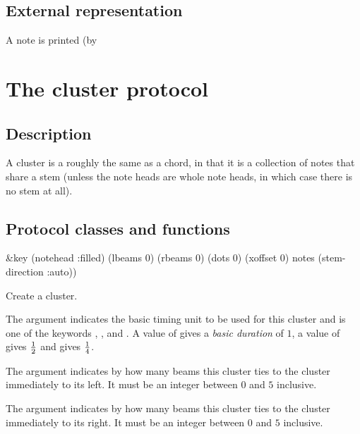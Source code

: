 \subsection{External representation}

A note is printed (by 

\section{The cluster protocol}

\subsection{Description}

A cluster is a roughly the same as a chord, in that it is a collection
of notes that share a stem  (unless the note heads are whole note
heads, in which case there is no stem at all).  

\subsection{Protocol classes and functions}


 {&key (notehead :filled) (lbeams 0) (rbeams 0)
		       (dots 0) (xoffset 0) notes (stem-direction :auto))}

Create a cluster.

The  argument indicates the basic timing unit to be
used for this cluster and is one of the keywords ,
, and .  A value of 
gives a \emph{basic duration} of $1$, a value of  gives $1
\over 2$ and  gives $1 \over 4$. 

The  argument indicates by how many beams this cluster
ties to the cluster immediately to its left.  It must be an integer
between $0$ and $5$ inclusive. 

The  argument indicates by how many beams this cluster
ties to the cluster immediately to its right.  It must be an integer
between $0$ and $5$ inclusive. 

